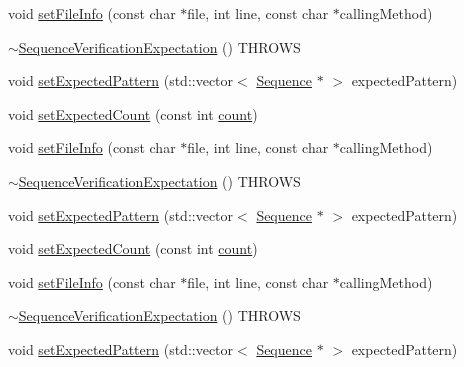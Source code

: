 \begin{DoxyCompactItemize}
\item 
void \mbox{\hyperlink{structfakeit_1_1SequenceVerificationExpectation_af6ca6f44173d64798ddc99d494c40c2f}{set\+File\+Info}} (const char $\ast$file, int line, const char $\ast$calling\+Method)
\item 
\mbox{\hyperlink{structfakeit_1_1SequenceVerificationExpectation_a2378bd3fa4b42806ced08be01261d9ab}{$\sim$\+Sequence\+Verification\+Expectation}} () T\+H\+R\+O\+WS
\item 
void \mbox{\hyperlink{structfakeit_1_1SequenceVerificationExpectation_acf31012cd30a4213e3fb927549525c7d}{set\+Expected\+Pattern}} (std\+::vector$<$ \mbox{\hyperlink{classfakeit_1_1Sequence}{Sequence}} $\ast$ $>$ expected\+Pattern)
\item 
void \mbox{\hyperlink{structfakeit_1_1SequenceVerificationExpectation_aeb5a9670fec5f1c6174bd5206074d428}{set\+Expected\+Count}} (const int \mbox{\hyperlink{gmock__stress__test_8cc_afd9db40e3361ae09188795e8cbe19752}{count}})
\item 
void \mbox{\hyperlink{structfakeit_1_1SequenceVerificationExpectation_af6ca6f44173d64798ddc99d494c40c2f}{set\+File\+Info}} (const char $\ast$file, int line, const char $\ast$calling\+Method)
\item 
\mbox{\hyperlink{structfakeit_1_1SequenceVerificationExpectation_a2378bd3fa4b42806ced08be01261d9ab}{$\sim$\+Sequence\+Verification\+Expectation}} () T\+H\+R\+O\+WS
\item 
void \mbox{\hyperlink{structfakeit_1_1SequenceVerificationExpectation_acf31012cd30a4213e3fb927549525c7d}{set\+Expected\+Pattern}} (std\+::vector$<$ \mbox{\hyperlink{classfakeit_1_1Sequence}{Sequence}} $\ast$ $>$ expected\+Pattern)
\item 
void \mbox{\hyperlink{structfakeit_1_1SequenceVerificationExpectation_aeb5a9670fec5f1c6174bd5206074d428}{set\+Expected\+Count}} (const int \mbox{\hyperlink{gmock__stress__test_8cc_afd9db40e3361ae09188795e8cbe19752}{count}})
\item 
void \mbox{\hyperlink{structfakeit_1_1SequenceVerificationExpectation_af6ca6f44173d64798ddc99d494c40c2f}{set\+File\+Info}} (const char $\ast$file, int line, const char $\ast$calling\+Method)
\item 
\mbox{\hyperlink{structfakeit_1_1SequenceVerificationExpectation_a2378bd3fa4b42806ced08be01261d9ab}{$\sim$\+Sequence\+Verification\+Expectation}} () T\+H\+R\+O\+WS
\item 
void \mbox{\hyperlink{structfakeit_1_1SequenceVerificationExpectation_acf31012cd30a4213e3fb927549525c7d}{set\+Expected\+Pattern}} (std\+::vector$<$ \mbox{\hyperlink{classfakeit_1_1Sequence}{Sequence}} $\ast$ $>$ expected\+Pattern)

\end{DoxyCompactItemize}
